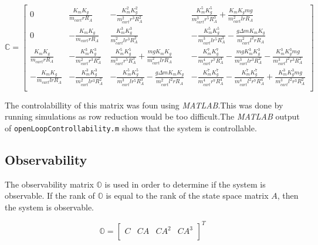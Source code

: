 \documentclass[12pt]{article} %
\begin{document}
\begin{equation}
\mathbb{C} = 
\begin{bmatrix}
0 & \frac{K_mK_g}{m_{cart}rR_A} & -\frac{K_m^2K_g^2}{m_{cart}^2r^3R_A^2} & \frac{K_m^5K_g^5}{m_{cart}^3r^5R_A^3}+\frac{K_mK_gmg}{m_{cart}^2lrR_A} \\
0 & -\frac{K_mK_g}{m_{cart}rR_A} & \frac{K_m^3K_g^3}{m_{cart}^2lr^3R_A^2} & -\frac{K_m^5K_g^5}{m_{cart}^3lr^5R_A^3}-\frac{g \Delta m K_mK_g}{m_{cart}^2l^2rR_A} \\
\frac{K_mK_g}{m_{cart}rR_A} & -\frac{K_m^3K_g^3}{m_{cart}^2r^3R_A^2} & \frac{K_m^5K_g^5}{m_{cart}^3r^5R_A^3}+\frac{mgK_mK_g}{m_{cart}^2lrR_A} & -\frac{K_m^7K_g^7}{m_{cart}^4r^7R_A^4} - \frac{mgK_m^3K_g^3}{m_{cart}^3lr^3R_A^2} - \frac{K_m^3K_g^3mg}{m_{cart}^3l^2r^3R_A^2} \\
-\frac{K_mK_g}{m_{cart}lrR_A} & -\frac{K_m^3K_g^3}{m_{cart}^2lr^3R_A^2} & -\frac{K_m^5K_g^5}{m_{cart}^3lr^5R_A^3}-\frac{g \Delta m K_mK_g}{m_{cart}^2l^2rR_A} & -\frac{K_m^7K_g^7}{m_{cart}^4r^7R_A^4} - \frac{K_m^7K_g^7}{m_{cart}^4l^2r^7R_A^4} + \frac{K_m^3K_g^3mg}{m_{cart}^3l^2r^3R_A^2} \\
\end{bmatrix}
\end{equation}


The controlabillity of this matrix was foun using \textit{MATLAB}.This was done by running simulations as row reduction would be too difficult.The \textit{MATLAB} output of \texttt{openLoopControllability.m} shows that the system is controllable. 
\subsection{Observability}
The observability matrix $\mathbb{O}$ is used in order to determine if the system is observable.  If the rank of $\mathbb{O}$ is equal to the rank of the state space matrix $A$, then the system is observable. 

\begin{equation}
\mathbb{O} = 
\begin{bmatrix}
C & CA & CA^2 & CA^3 \\
\end{bmatrix}^T
\end{equation}
\end{document}
